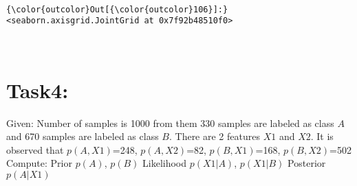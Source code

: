 \documentclass[11pt]{article}
\begin{document}
    \begin{center}
    \end{center}
    { \hspace*{\fill} \\}
    
\begin{Verbatim}[commandchars=\\\{\}]
{\color{outcolor}Out[{\color{outcolor}106}]:} <seaborn.axisgrid.JointGrid at 0x7f92b48510f0>
\end{Verbatim}
            
    \begin{center}
    \end{center}
    { \hspace*{\fill} \\}
    
    \section{Task4:}\label{task4}

Given: Number of samples is 1000 from them 330 samples are labeled as
class \(A\) and 670 samples are labeled as class \(B\). There are 2
features \(X1\) and \(X2\). It is observed that \(p(A,X1)\)=248,
\(p(A,X2)\)=82, \(p(B,X1)\)=168, \(p(B,X2)\)=502 Compute: Prior
\(p(A)\), \(p(B)\) Likelihood \(p(X1|A)\), \(p(X1|B)\) Posterior
\(p(A|X1)\)
\end{document}
